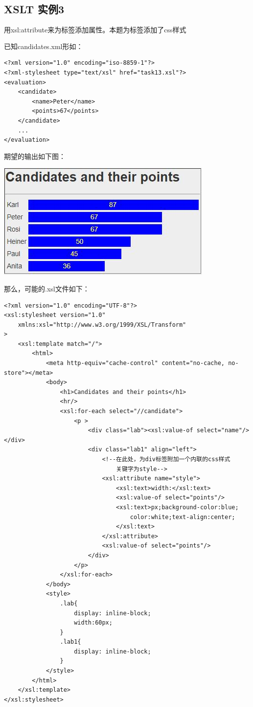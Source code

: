 \documentclass[fontset=windows]{article}
\begin{document}
\subsection{XSLT 实例3}

用xsl:attribute来为标签添加属性。本题为标签添加了css样式

已知candidates.xml形如：

\begin{verbatim}
<?xml version="1.0" encoding="iso-8859-1"?>
<?xml-stylesheet type="text/xsl" href="task13.xsl"?>
<evaluation>
	<candidate>
		<name>Peter</name>
		<points>67</points>
	</candidate>
	...
</evaluation>
\end{verbatim}

期望的输出如下图：

\begin{center}
\includegraphics[scale=0.8]{4.jpg}
\end{center}

那么，可能的.xsl文件如下：

\begin{verbatim}
<?xml version="1.0" encoding="UTF-8"?>
<xsl:stylesheet version="1.0"
    xmlns:xsl="http://www.w3.org/1999/XSL/Transform"
>
	<xsl:template match="/">
		<html>
			<meta http-equiv="cache-control" content="no-cache, no-store"></meta>
			<body>
				<h1>Candidates and their points</h1>
				<hr/>
				<xsl:for-each select="//candidate">
					<p >
						<div class="lab"><xsl:value-of select="name"/></div>
						<div class="lab1" align="left">
							<!--在此处，为div标签附加一个内联的css样式
								关键字为style-->
							<xsl:attribute name="style">
								<xsl:text>width:</xsl:text>
								<xsl:value-of select="points"/>
								<xsl:text>px;background-color:blue;
									color:white;text-align:center;
								</xsl:text>
							</xsl:attribute>
							<xsl:value-of select="points"/>
						</div>
					</p>
				</xsl:for-each>
			</body>
			<style>
				.lab{
					display: inline-block;
					width:60px;
				}
				.lab1{
					display: inline-block;
				}
			</style>
		</html>
	</xsl:template>
</xsl:stylesheet>
\end{verbatim}
\end{document}
